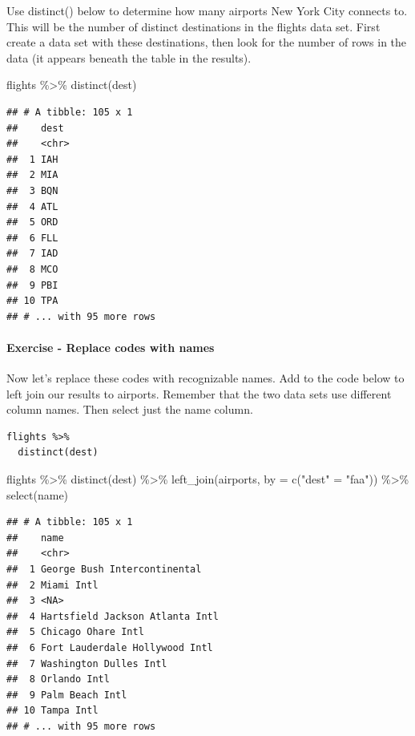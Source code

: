 \documentclass[
]{article}
\newenvironment{Shaded}{\begin{snugshade}}{\end{snugshade}}
\newcommand{\AttributeTok}[1]{\textcolor[rgb]{0.77,0.63,0.00}{#1}}
\newcommand{\FunctionTok}[1]{\textcolor[rgb]{0.00,0.00,0.00}{#1}}
\newcommand{\NormalTok}[1]{#1}
\newcommand{\OtherTok}[1]{\textcolor[rgb]{0.56,0.35,0.01}{#1}}
\newcommand{\SpecialCharTok}[1]{\textcolor[rgb]{0.00,0.00,0.00}{#1}}
\newcommand{\StringTok}[1]{\textcolor[rgb]{0.31,0.60,0.02}{#1}}
\begin{document}
Use distinct() below to determine how many airports New York City
connects to. This will be the number of distinct destinations in the
flights data set. First create a data set with these destinations, then
look for the number of rows in the data (it appears beneath the table in
the results).

\begin{Shaded}
\begin{Highlighting}[]
\NormalTok{flights }\SpecialCharTok{\%\textgreater{}\%} 
  \FunctionTok{distinct}\NormalTok{(dest)}
\end{Highlighting}
\end{Shaded}

\begin{verbatim}
## # A tibble: 105 x 1
##    dest 
##    <chr>
##  1 IAH  
##  2 MIA  
##  3 BQN  
##  4 ATL  
##  5 ORD  
##  6 FLL  
##  7 IAD  
##  8 MCO  
##  9 PBI  
## 10 TPA  
## # ... with 95 more rows
\end{verbatim}

\hypertarget{exercise---replace-codes-with-names}{%
\paragraph{Exercise - Replace codes with
names}\label{exercise---replace-codes-with-names}}

Now let's replace these codes with recognizable names. Add to the code
below to left join our results to airports. Remember that the two data
sets use different column names. Then select just the name column.

\begin{verbatim}
flights %>% 
  distinct(dest) 
\end{verbatim}

\begin{Shaded}
\begin{Highlighting}[]
\NormalTok{flights }\SpecialCharTok{\%\textgreater{}\%} 
  \FunctionTok{distinct}\NormalTok{(dest) }\SpecialCharTok{\%\textgreater{}\%}
  \FunctionTok{left\_join}\NormalTok{(airports, }\AttributeTok{by =} \FunctionTok{c}\NormalTok{(}\StringTok{"dest"} \OtherTok{=} \StringTok{"faa"}\NormalTok{)) }\SpecialCharTok{\%\textgreater{}\%}
  \FunctionTok{select}\NormalTok{(name)}
\end{Highlighting}
\end{Shaded}

\begin{verbatim}
## # A tibble: 105 x 1
##    name                           
##    <chr>                          
##  1 George Bush Intercontinental   
##  2 Miami Intl                     
##  3 <NA>                           
##  4 Hartsfield Jackson Atlanta Intl
##  5 Chicago Ohare Intl             
##  6 Fort Lauderdale Hollywood Intl 
##  7 Washington Dulles Intl         
##  8 Orlando Intl                   
##  9 Palm Beach Intl                
## 10 Tampa Intl                     
## # ... with 95 more rows
\end{verbatim}
\end{document}

